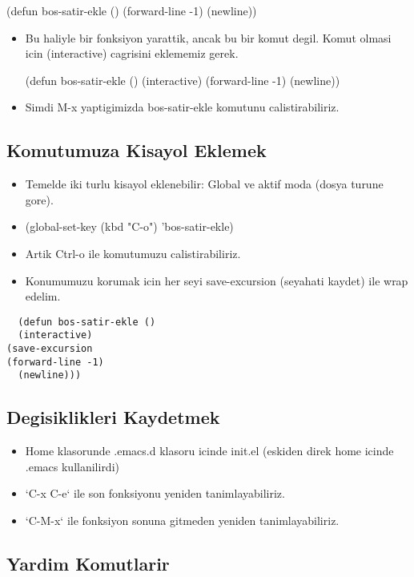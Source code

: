 \documentclass[11pt]{article}
\begin{document}
(defun bos-satir-ekle ()
    (forward-line -1)
    (newline))

\begin{itemize}
\item Bu haliyle bir fonksiyon yarattik, ancak bu bir komut degil. Komut
olmasi icin (interactive) cagrisini eklememiz gerek.

(defun bos-satir-ekle ()
(interactive)
(forward-line -1)
(newline))

\item Simdi M-x yaptigimizda bos-satir-ekle komutunu calistirabiliriz.
\end{itemize}

\subsection{Komutumuza Kisayol Eklemek}
\label{sec-3-5}

\begin{itemize}
\item Temelde iki turlu kisayol eklenebilir: Global ve aktif moda (dosya turune gore).

\item (global-set-key (kbd "C-o") 'bos-satir-ekle)

\item Artik Ctrl-o ile komutumuzu calistirabiliriz.

\item Konumumuzu korumak icin her seyi save-excursion (seyahati kaydet) ile wrap edelim.
\end{itemize}
\begin{verbatim}
  (defun bos-satir-ekle ()
  (interactive)
(save-excursion
(forward-line -1)
  (newline)))
\end{verbatim}

\subsection{Degisiklikleri Kaydetmek}
\label{sec-3-6}
\begin{itemize}
\item Home klasorunde .emacs.d klasoru icinde init.el (eskiden direk home icinde .emacs kullanilirdi)
\item `C-x C-e` ile son fonksiyonu yeniden tanimlayabiliriz.
\item `C-M-x` ile fonksiyon sonuna gitmeden yeniden tanimlayabiliriz.
\end{itemize}

\subsection{Yardim Komutlarir}
\label{sec-3-7}
\end{document}
